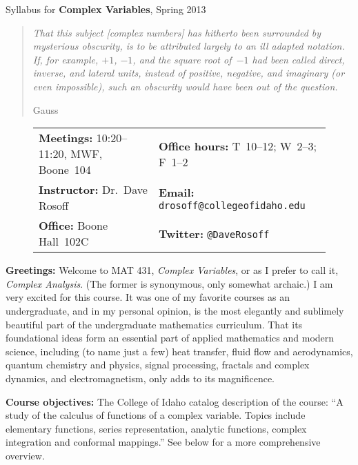 \documentclass[11pt]{amsart}
\newcommand{\officehours}{T~10--12; W~2--3; F~1--2}
\begin{document}
\thispagestyle{empty}

\begin{center}
    {\Large Syllabus for \textbf{Complex Variables}, Spring 2013}
\end{center}
\begin{quote}
    {\small \emph{That this subject [complex numbers] has hitherto been surrounded by mysterious obscurity, is to be attributed largely to an ill adapted notation. If, for example, $+1$, $-1$, and the square root of~$-1$ had been called \emph{direct}, \emph{inverse}, and \emph{lateral} units, instead of positive, negative, and imaginary (or even impossible), such an obscurity would have been out of the question.}}
    \begin{flushright}
        {\small Gauss}
    \end{flushright}
\end{quote}

\begin{figure}[ht]
\centering
    \begin{tabularx}{1.0\textwidth}{XX}
        \textbf{Meetings:} 10:20--11:20, MWF, Boone~104 
                & \textbf{Office hours:} \officehours \\
        \textbf{Instructor:} Dr.\ Dave Rosoff 
                & \textbf{Email:} \nolinkurl{drosoff@collegeofidaho.edu} \\
        \textbf{Office:} Boone Hall~102C 
                & \textbf{Twitter:} \nolinkurl{@DaveRosoff}
    \end{tabularx}
\end{figure}
\textbf{Greetings:} Welcome to MAT 431, \emph{Complex Variables}, or as I prefer to call it, \emph{Complex Analysis}. (The former is synonymous, only somewhat archaic.) I am very excited for this course. It was one of my favorite courses as an undergraduate, and in my personal opinion, is the  most elegantly and sublimely beautiful part of the undergraduate mathematics curriculum. That its foundational ideas form an essential part of applied mathematics and modern science, including (to name just a few) heat transfer, fluid flow and aerodynamics, quantum chemistry and physics, signal processing, fractals and complex dynamics, and electromagnetism, only adds to its magnificence.

\textbf{Course objectives:} The College of Idaho catalog description of the course: ``A study of the calculus of functions of a complex variable. Topics include elementary functions, series representation, analytic functions, complex integration and conformal mappings.'' See below for a more comprehensive overview.
\end{document}
